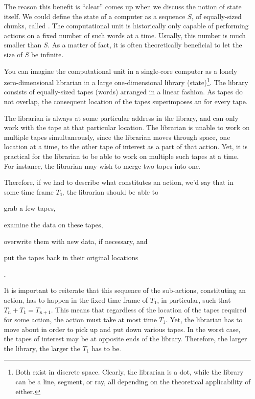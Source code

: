 The reason this benefit is ``clear'' comes up when we discuss the notion of
state itself. We could define the state of a computer as a sequence $S$, of
equally-sized chunks, called . The computational unit is historically
only capable of performing actions on a fixed number of such words at a time.
Usually, this number is much smaller than $S$. As a matter of fact, it is often
theoretically beneficial to let the size of $S$ be infinite.

You can imagine the computational unit in a single-core computer as a lonely
zero-dimensional librarian in a large one-dimensional library
(state)\footnote{Both exist in discrete space. Clearly, the librarian is a dot,
while the library can be a line, segment, or ray, all depending on the
theoretical applicability of either.}. The library consists of equally-sized
tapes (words) arranged in a linear fashion.  As tapes do not overlap, the
consequent location of the tapes superimposes an  for every tape.

The librarian is always at some particular address in the library, and can only
work with the tape at that particular location. The librarian is unable to work
on multiple tapes simultaneously, since the librarian moves through space, one
location at a time, to the other tape of interest as a part of that action.
Yet, it is practical for the librarian to be able to work on multiple such
tapes at a time. For instance, the librarian may wish to merge two tapes into
one.



Therefore, if we had to describe what constitutes an action, we'd say that in
some time frame $T_1$, the librarian should be able to \begin{inparaenum}[(1)]
\item grab a few tapes, \item examine the data on these tapes, \item overwrite
them with new data, if necessary, and \item put the tapes back in their
original locations\end{inparaenum}.

It is important to reiterate that this sequence of the sub-actions,
constituting an action, has to happen in the fixed time frame of $T_1$, in
particular, such that $T_n+T_1=T_{n+1}$.  This means that regardless of the
location of the tapes required for some action, the action must take at most
time $T_1$. Yet, the librarian has to move about in order to pick up and put
down various tapes. In the worst case, the tapes of interest may be at opposite
ends of the library. Therefore, the larger the library, the larger the $T_1$
has to be. 

